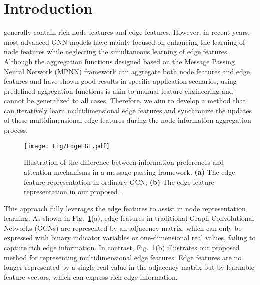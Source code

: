 \section{Introduction}
\label{sec:intro}

 generally contain rich node features and edge features. 
However, in recent years, most advanced GNN models have mainly focused on enhancing the learning of node features while neglecting the simultaneous learning of edge features. 
Although the aggregation functions designed based on the Message Passing Neural Network (MPNN) framework can aggregate both node features and edge features and have shown good results in specific application scenarios, using predefined aggregation functions is akin to manual feature engineering and cannot be generalized to all cases. 
Therefore, we aim to develop a method that can iteratively learn multidimensional edge features and synchronize the updates of these multidimensional edge features during the node information aggregation process. 
\begin{figure}[!t]
    \centering
    \texttt{[image: Fig/EdgeFGL.pdf]}
    \caption{
    Illustration of the difference between information preferences and attention mechanisms in a message passing framework.
    \textbf{(a)} The edge feature representation in ordinary GCN;
    \textbf{(b)} The edge feature representation in our proposed \alg.
    }
    \label{fig:intro1}
\end{figure}
This approach fully leverages the edge features to assist in node representation learning. 
As shown in Fig.~\ref{fig:intro1}(a), edge features in traditional Graph Convolutional Networks (GCNs) are represented by an adjacency matrix, which can only be expressed with binary indicator variables or one-dimensional real values, failing to capture rich edge information. 
In contrast, Fig.~\ref{fig:intro1}(b) illustrates our proposed method for representing multidimensional edge features. 
Edge features are no longer represented by a single real value in the adjacency matrix but by learnable feature vectors, which can express rich edge information.

